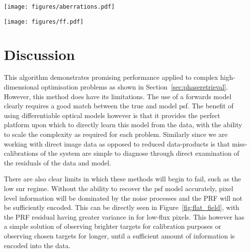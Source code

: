 \documentclass[]{spieman}
\begin{document}
\begin{figure*}
    \centering
    \texttt{[image: figures/aberrations.pdf]}
    \caption{Recovery of the optical aberrations after optimisation. Left: the amplitudes of the Zernike polynomial coefficients, with the top section showing the correlation plot of the true and recovered values, and the bottom showing the individual residuals. Middle and right: the true total \ac{opd} and the residuals generated by these values respectively.}
    \label{fig:aberrations}
\end{figure*}

\begin{figure*}
    \centering
    \texttt{[image: figures/ff.pdf]}
    \caption{This figure shows the PRF values after optimisation. The left panel shows the correlation between the pixel-level true and recovered values. Each ploint is color-coded with the total flux incident to each pixel, ie its \ac{snr}. The pixels with a greater signal are recovered better as expected. The right panel shows the histogram of these residuals, with the majority of values being very well recovered and small symmetric about a residual of zero.}
    \label{fig:flat_field}
\end{figure*}

\section{Discussion}

This algorithm demonstrates promising performance applied to complex high-dimensional optimisation problems as shown in Section~\ref{sec:phaseretrieval}. However, this method does have its limitations. The use of a forwards model clearly requires a good match between the true and model \ac{psf}. The benefit of using differentiable optical models however is that it provides the perfect platform upon which to directly learn this model from the data, with the ability to scale the complexity as required for each problem. Similarly since we are working with direct image data as opposed to reduced data-products is that miss-calibrations of the system are simple to diagnose through direct examination of the residuals of the data and model.

There are also clear limits in which these methods will begin to fail, such as the low \ac{snr} regime. Without the ability to recover the \ac{psf} model accurately, pixel level information will be dominated by the noise processes and the PRF will not be sufficiently encoded. This can be directly seen in Figure~\ref{fig:flat_field}, with the PRF residual having greater variance in for low-flux pixels. This however has a simple solution of observing brighter targets for calibration purposes or observing chosen targets for longer, until a sufficient amount of information is encoded into the data.
\end{document}
